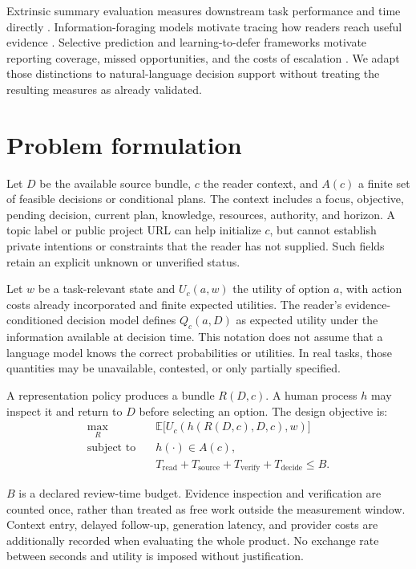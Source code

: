 \documentclass[11pt]{article}
\begin{document}
Extrinsic summary evaluation measures downstream task performance and time directly \citep{pu_etal_2024_extrinsic}. Information-foraging models motivate tracing how readers reach useful evidence \citep{pirollifu2003snifact}. Selective prediction and learning-to-defer frameworks motivate reporting coverage, missed opportunities, and the costs of escalation \citep{geifman2019selectivenet,mozannar2020defer}. We adapt those distinctions to natural-language decision support without treating the resulting measures as already validated.

\section{Problem formulation}

Let $D$ be the available source bundle, $c$ the reader context, and $A(c)$ a finite set of feasible decisions or conditional plans. The context includes a focus, objective, pending decision, current plan, knowledge, resources, authority, and horizon. A topic label or public project URL can help initialize $c$, but cannot establish private intentions or constraints that the reader has not supplied. Such fields retain an explicit unknown or unverified status.

Let $w$ be a task-relevant state and $U_c(a,w)$ the utility of option $a$, with action costs already incorporated and finite expected utilities. The reader's evidence-conditioned decision model defines $Q_c(a,D)$ as expected utility under the information available at decision time. This notation does not assume that a language model knows the correct probabilities or utilities. In real tasks, those quantities may be unavailable, contested, or only partially specified.

A representation policy produces a bundle $R(D,c)$. A human process $h$ may inspect it and return to $D$ before selecting an option. The design objective is:
\[
\begin{aligned}
\max_R\quad &\mathbb{E}\bigl[U_c(h(R(D,c),D,c),w)\bigr]\\
\text{subject to}\quad &h(\cdot)\in A(c),\\
&T_{\mathrm{read}}+T_{\mathrm{source}}+T_{\mathrm{verify}}+T_{\mathrm{decide}}\leq B.
\end{aligned}
\]

$B$ is a declared review-time budget. Evidence inspection and verification are counted once, rather than treated as free work outside the measurement window. Context entry, delayed follow-up, generation latency, and provider costs are additionally recorded when evaluating the whole product. No exchange rate between seconds and utility is imposed without justification.
\end{document}
